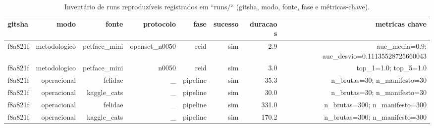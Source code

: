 \begin{table}[!htb]
\centering
\caption{Inventário de runs reproduzíveis registrados em ``runs/`` (gitsha, modo, fonte, fase e métricas-chave).}
\label{tab:run-inventory}
\begin{tabular}{lrrrrrrr}
\toprule
gitsha & modo & fonte & protocolo & fase & sucesso & duracao s & metricas chave \\
\midrule
f8a821f & metodologico & petface\_mini & openset\_n0050 & reid & sim & 2.9 & auc\_media=0.9; auc\_desvio=0.11135528725660043 \\
f8a821f & metodologico & petface\_mini & n0050 & reid & sim & 3.0 & top\_1=1.0; top\_5=1.0 \\
f8a821f & operacional & felidae & \_ & pipeline & sim & 35.3 & n\_brutas=30; n\_manifesto=30 \\
f8a821f & operacional & kaggle\_cats & \_ & pipeline & sim & 30.0 & n\_brutas=30; n\_manifesto=30 \\
f8a821f & operacional & felidae & \_ & pipeline & sim & 331.0 & n\_brutas=300; n\_manifesto=300 \\
f8a821f & operacional & kaggle\_cats & \_ & pipeline & sim & 170.2 & n\_brutas=300; n\_manifesto=300 \\
\bottomrule
\end{tabular}
\end{table}
